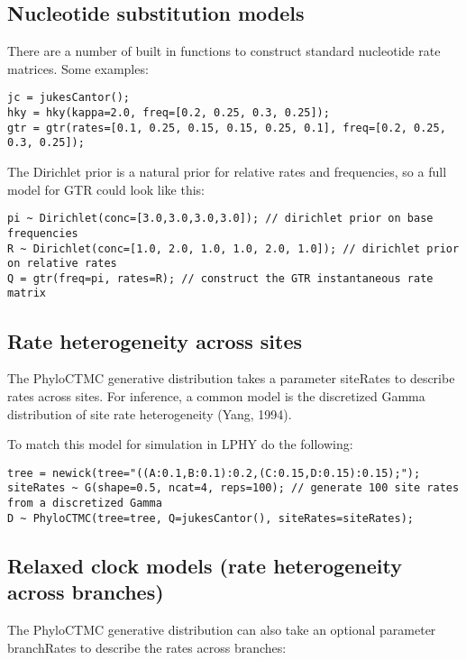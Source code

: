 \documentclass[oneside]{article}
\begin{document}
\subsection{ Nucleotide substitution models}

There are a number of built in functions to construct standard nucleotide rate matrices. Some examples:

\begin{verbatim}
jc = jukesCantor();
hky = hky(kappa=2.0, freq=[0.2, 0.25, 0.3, 0.25]);
gtr = gtr(rates=[0.1, 0.25, 0.15, 0.15, 0.25, 0.1], freq=[0.2, 0.25, 0.3, 0.25]);
\end{verbatim}

The Dirichlet prior is a natural prior for relative rates and frequencies, so a full model for GTR could
look like this:

\begin{verbatim}
pi ~ Dirichlet(conc=[3.0,3.0,3.0,3.0]); // dirichlet prior on base frequencies
R ~ Dirichlet(conc=[1.0, 2.0, 1.0, 1.0, 2.0, 1.0]); // dirichlet prior on relative rates
Q = gtr(freq=pi, rates=R); // construct the GTR instantaneous rate matrix
\end{verbatim}

\subsection{ Rate heterogeneity across sites}

The PhyloCTMC generative distribution takes a parameter siteRates to describe rates across sites.
For inference, a common model is the discretized Gamma distribution of site rate heterogeneity (Yang, 1994).

To match this model for simulation in LPHY do the following:

\begin{verbatim}
tree = newick(tree="((A:0.1,B:0.1):0.2,(C:0.15,D:0.15):0.15);");
siteRates ~ G(shape=0.5, ncat=4, reps=100); // generate 100 site rates from a discretized Gamma
D ~ PhyloCTMC(tree=tree, Q=jukesCantor(), siteRates=siteRates);
\end{verbatim}

\subsection{  Relaxed clock models (rate heterogeneity across branches) }

The PhyloCTMC generative distribution can also take an optional parameter branchRates to describe the
rates across branches:
\end{document}
